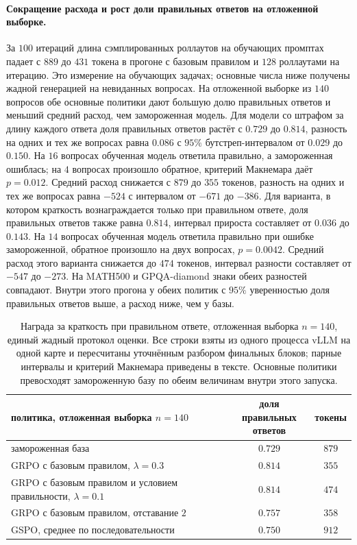 \documentclass[11pt]{article}
\begin{document}
\paragraph{Сокращение расхода и рост доли правильных ответов на отложенной выборке.} За $100$ итераций длина сэмплированных роллаутов на обучающих промптах падает с $889$ до $431$ токена в прогоне с базовым правилом и $128$ роллаутами на итерацию. Это измерение на обучающих задачах; основные числа ниже получены жадной генерацией на невиданных вопросах. На отложенной выборке из $140$ вопросов обе основные политики дают большую долю правильных ответов и меньший средний расход, чем замороженная модель. Для модели со штрафом за длину каждого ответа доля правильных ответов растёт с $0.729$ до $0.814$, разность на одних и тех же вопросах равна $0.086$ с $95\%$ бутстреп-интервалом от $0.029$ до $0.150$. На $16$ вопросах обученная модель ответила правильно, а замороженная ошиблась; на $4$ вопросах произошло обратное, критерий Макнемара даёт $p=0.012$. Средний расход снижается с $879$ до $355$ токенов, разность на одних и тех же вопросах равна $-524$ с интервалом от $-671$ до $-386$. Для варианта, в котором краткость вознаграждается только при правильном ответе, доля правильных ответов также равна $0.814$, интервал прироста составляет от $0.036$ до $0.143$. На $14$ вопросах обученная модель ответила правильно при ошибке замороженной, обратное произошло на двух вопросах, $p=0.0042$. Средний расход этого варианта снижается до $474$ токенов, интервал разности составляет от $-547$ до $-273$. На MATH500 и GPQA-diamond знаки обеих разностей совпадают. Внутри этого прогона у обеих политик с $95\%$ уверенностью доля правильных ответов выше, а расход ниже, чем у базы.

\begin{table}[t]
\centering
\begin{tabular}{lcc}
\toprule
политика, отложенная выборка $n{=}140$ & \shortstack{доля правильных\\ответов} & токены \\
\midrule
замороженная база                        & $0.729$ & $879$ \\
GRPO с базовым правилом, $\lambda{=}0.3$                     & $0.814$ & $355$ \\
GRPO с базовым правилом и условием правильности, $\lambda{=}0.1$ & $0.814$ & $474$ \\
GRPO с базовым правилом, отставание $2$ & $0.757$ & $358$ \\
GSPO, среднее по последовательности & $0.750$ & $912$ \\
\bottomrule
\end{tabular}
\caption{Награда за краткость при правильном ответе, отложенная выборка $n{=}140$, единый жадный протокол оценки. Все строки взяты из одного процесса vLLM на одной карте и пересчитаны уточнённым разбором финальных блоков; парные интервалы и критерий Макнемара приведены в тексте. Основные политики превосходят замороженную базу по обеим величинам внутри этого запуска.}
\label{tab:grpo}
\end{table}
\end{document}
